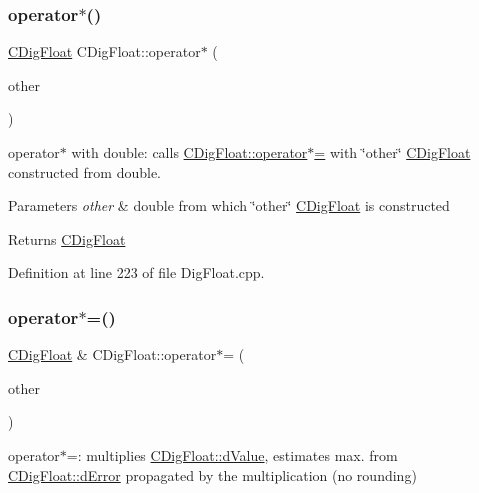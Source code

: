 \subsubsection{\texorpdfstring{operator$\ast$()}{operator*()}\hspace{0.1cm}{\footnotesize\ttfamily [2/2]}}
{\footnotesize\ttfamily \hyperlink{classCDigFloat}{C\+Dig\+Float} C\+Dig\+Float\+::operator$\ast$ (\begin{DoxyParamCaption}\item[{const double}]{other }\end{DoxyParamCaption})}



operator$\ast$ with double\+: calls \hyperlink{classCDigFloat_a9535d47a31a3f1cfa487cc8c567a4a12}{C\+Dig\+Float\+::operator$\ast$=} with \char`\"{}other\char`\"{} \hyperlink{classCDigFloat}{C\+Dig\+Float} constructed from double. 


\begin{DoxyParams}{Parameters}
{\em other} & double from which \char`\"{}other\char`\"{} \hyperlink{classCDigFloat}{C\+Dig\+Float} is constructed \\
\hline
\end{DoxyParams}
\begin{DoxyReturn}{Returns}
\hyperlink{classCDigFloat}{C\+Dig\+Float} 
\end{DoxyReturn}


Definition at line 223 of file Dig\+Float.\+cpp.

\mbox{\label{classCDigFloat_a9535d47a31a3f1cfa487cc8c567a4a12}} 
\subsubsection{\texorpdfstring{operator$\ast$=()}{operator*=()}\hspace{0.1cm}{\footnotesize\ttfamily [1/2]}}
{\footnotesize\ttfamily \hyperlink{classCDigFloat}{C\+Dig\+Float} \& C\+Dig\+Float\+::operator$\ast$= (\begin{DoxyParamCaption}\item[{const \hyperlink{classCDigFloat}{C\+Dig\+Float} \&}]{other }\end{DoxyParamCaption})}



operator$\ast$=\+: multiplies \hyperlink{classCDigFloat_a4bbe69e30dd4e20527362493aa9aaf96}{C\+Dig\+Float\+::d\+Value}, estimates max. from \hyperlink{classCDigFloat_a25eb3782d1e727ff007a48f8308e3d4d}{C\+Dig\+Float\+::d\+Error} propagated by the multiplication (no rounding) 


